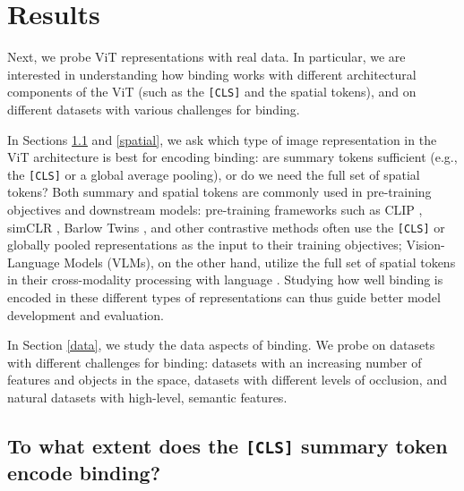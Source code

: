 \documentclass{article}
\theoremstyle{plain}
\theoremstyle{definition}
\theoremstyle{remark}
\begin{document}
\section{Results}
\label{results}
Next, we probe ViT representations with real data. In particular, we are interested in understanding how binding works with different architectural components of the ViT (such as the \texttt{[CLS]} and the spatial tokens), and on different datasets with various challenges for binding.

In Sections \ref{cls} and \ref{spatial}, we ask which type of image representation in the ViT architecture is best for encoding binding: are summary tokens sufficient (e.g., the \texttt{[CLS]} or a global average pooling), or do we need the full set of spatial tokens? Both summary and spatial tokens are commonly used in pre-training objectives and downstream models: pre-training frameworks such as CLIP \cite{radford2021learningtransferablevisualmodels}, simCLR \cite{chen2020simpleframeworkcontrastivelearning}, Barlow Twins \cite{zbontar2021barlowtwinsselfsupervisedlearning}, and other contrastive methods often use the \texttt{[CLS]} or globally pooled representations as the input to their training objectives; Vision-Language Models (VLMs), on the other hand, utilize the full set of spatial tokens in their cross-modality processing with language \cite{liu2023visualinstructiontuning, bai2023qwenvlversatilevisionlanguagemodel}. Studying how well binding is encoded in these different types of representations can thus guide better model development and evaluation. 

In Section \ref{data}, we study the data aspects of binding. We probe on datasets with different challenges for binding: datasets with an increasing number of features and objects in the space, datasets with different levels of occlusion, and natural datasets with high-level, semantic features.



\subsection{To what extent does the \texttt{[CLS]} summary token encode binding?}
\label{cls}
\end{document}
